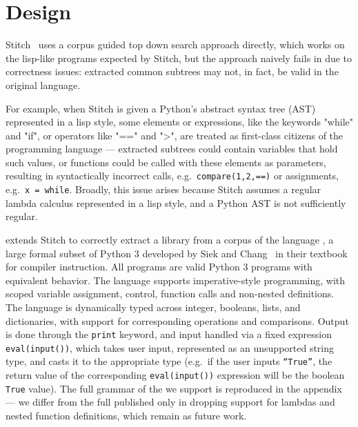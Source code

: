 \section{Design}
\label{sec:design}
Stitch~\cite{Bowers_2023stitch} uses a corpus guided top down search approach directly, which works on the lisp-like programs expected by Stitch, but the approach naively fails in  due to correctness issues: extracted common subtrees may not, in fact, be valid in the original language.

For example, when Stitch is given a Python's abstract syntax tree (AST) represented in a lisp style, 
some elements or expressions, like the keywords "while" and "if", or operators like "==" and ">", are treated as first-class citizens of the programming language --- extracted subtrees could contain variables that hold such values, or functions could be called with these elements as parameters, resulting in syntactically incorrect calls, 
e.g.\ \texttt{compare(1,2,==)} or assignments, e.g.\ \texttt{x = while}.
Broadly, this issue arises because Stitch assumes a regular lambda calculus represented in a lisp style, and a Python AST is not sufficiently regular. 

\toolname{} extends Stitch to correctly extract a library from a corpus of the language \ptwo{}, a large formal subset of Python 3 developed by Siek and Chang~\cite{pythonbook} in their textbook for compiler instruction. All \ptwo{} programs are valid Python 3 programs with equivalent behavior.  The \ptwo{} language supports imperative-style programming, with scoped variable assignment, control, function calls and non-nested definitions.  The language is dynamically typed across integer, booleans, lists, and dictionaries, with support for corresponding operations and comparisons.  Output is done through the \texttt{print} keyword, and input handled via a fixed expression \texttt{eval(input())}, which takes user input, represented as an unsupported string type, and casts it to the appropriate type (e.g.\  if the user inputs \texttt{``True''}, the return value of the corresponding \texttt{eval(input())} expression will be the boolean \texttt{True} value).  The full grammar of the \ptwo{} we support is reproduced in the appendix --- we differ from the full published \ptwo{} only in dropping support for lambdas and nested function definitions, which remain as future work.

